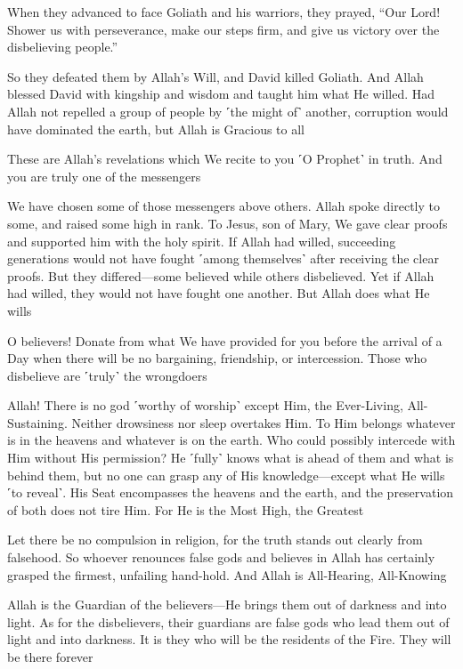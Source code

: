 When they advanced to face Goliath and his warriors, they prayed, “Our Lord! Shower us with perseverance, make our steps firm, and give us victory over the disbelieving people.”

So they defeated them by Allah’s Will, and David killed Goliath. And Allah blessed David with kingship and wisdom and taught him what He willed. Had Allah not repelled a group of people by ˹the might of˺ another, corruption would have dominated the earth, but Allah is Gracious to all

These are Allah’s revelations which We recite to you ˹O Prophet˺ in truth. And you are truly one of the messengers

We have chosen some of those messengers above others. Allah spoke directly to some, and raised some high in rank. To Jesus, son of Mary, We gave clear proofs and supported him with the holy spirit. If Allah had willed, succeeding generations would not have fought ˹among themselves˺ after receiving the clear proofs. But they differed—some believed while others disbelieved. Yet if Allah had willed, they would not have fought one another. But Allah does what He wills

O believers! Donate from what We have provided for you before the arrival of a Day when there will be no bargaining, friendship, or intercession. Those who disbelieve are ˹truly˺ the wrongdoers

Allah! There is no god ˹worthy of worship˺ except Him, the Ever-Living, All-Sustaining. Neither drowsiness nor sleep overtakes Him. To Him belongs whatever is in the heavens and whatever is on the earth. Who could possibly intercede with Him without His permission? He ˹fully˺ knows what is ahead of them and what is behind them, but no one can grasp any of His knowledge—except what He wills ˹to reveal˺. His Seat encompasses the heavens and the earth, and the preservation of both does not tire Him. For He is the Most High, the Greatest

Let there be no compulsion in religion, for the truth stands out clearly from falsehood. So whoever renounces false gods and believes in Allah has certainly grasped the firmest, unfailing hand-hold. And Allah is All-Hearing, All-Knowing

Allah is the Guardian of the believers—He brings them out of darkness and into light. As for the disbelievers, their guardians are false gods who lead them out of light and into darkness. It is they who will be the residents of the Fire. They will be there forever

